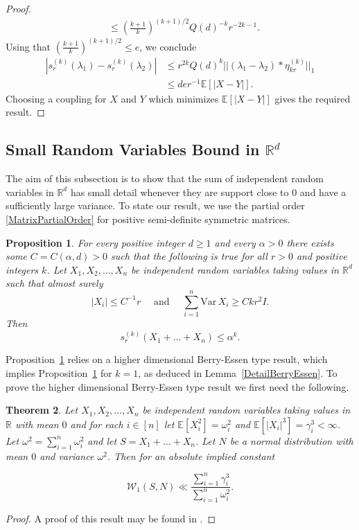 \documentclass[10pt, english,oneside,reqno]{amsart}
\theoremstyle{plain}
\newtheorem{theorem}{Theorem}[section]
\newtheorem{proposition}[theorem]{Proposition}
\theoremstyle{remark}
\numberwithin{equation}{section}
\numberwithin{figure}{section}
\newcommand{\R}{\mathbb{R}}
\newcommand{\E}{\mathbb{E}}
\begin{document}
\begin{proof}
\begin{align*}
    &\leq \left( \frac{k+ 1}{k}  \right)^{(k+1)/2} Q(d)^{-k} r^{-2k-1}. 
    \end{align*} Using that $\left( \frac{k+ 1}{k}  \right)^{(k+1)/2} \leq e$, we conclude  
    \begin{align*}
        |s_r^{(k)}(\lambda_1) - s_r^{(k)}(\lambda_2)| &\leq r^{2k} Q(d)^k ||(\lambda_1 - \lambda_2)*\eta_{kr}^{(k)}||_1 \\
        &\leq de r^{-1}\E[|X-Y|].
    \end{align*}
    Choosing a coupling for $X$ and $Y$ which minimizes $\E[|X-Y|]$ gives the required result. 
\end{proof}

\subsection{Small Random Variables Bound in $\R^d$} \label{Detail:Convert}

The aim of this subsection is to show that the sum of independent random variables in $\R^d$ has small detail whenever they are support close to $0$ and have a sufficiently large variance. To state our result, we use the partial order \eqref{MatrixPartialOrder} for positive semi-definite symmetric matrices. 

\begin{proposition}\label{kDetailBerryEssen}
    For every positive integer $d\geq 1$ and every $\alpha > 0$ there exists some $C = C(\alpha,d) > 0$ such that the following is true for all $r > 0$ and positive integers $k$. Let $X_1, X_2, \ldots , X_n$ be independent random variables taking values in $\R^d$ such that almost surely $$|X_i| \leq C^{-1} r \quad \text{ and } \quad \sum_{i = 1}^n \mathrm{Var} \, X_i \geq C k r^2 I.$$ Then $$s_r^{(k)}(X_1 + \ldots + X_n) \leq \alpha^k.$$
\end{proposition}

Proposition~\ref{kDetailBerryEssen} relies on a higher dimensional Berry-Essen type result, which implies Proposition~\ref{kDetailBerryEssen} for $k=1$, as deduced in Lemma~\ref{DetailBerryEssen}. To prove the higher dimensional Berry-Essen type result we first need the following.
	
	\begin{theorem} \label{BerryEssenType1D}
		Let $X_1, X_2, \dots, X_n$ be independent random variables taking values in $\R$ with mean $0$ and for each $i \in [n]$ let $\mathbb{E}[X_i^2] = \omega_i^2$ and $\mathbb{E}[|X_i|^3] = \gamma_i^3 < \infty$. Let $\omega^2 = \sum_{i=1}^n \omega_i^2$ and let $S = X_1 + \dots + X_n$. Let $N$ be a normal distribution with mean $0$ and variance $\omega^2$. Then for an absolute implied constant
		
		\begin{equation*}
		\mathcal{W}_1(S, N) \ll \frac{\sum_{i=1}^n \gamma_i^3}{\sum_{i=1}^n \omega_i^2}.
		\end{equation*}
		
	\end{theorem}
	\begin{proof}
		A proof of this result may be found in \cite{Erickson_1973}.
	\end{proof}
	
\end{document}
